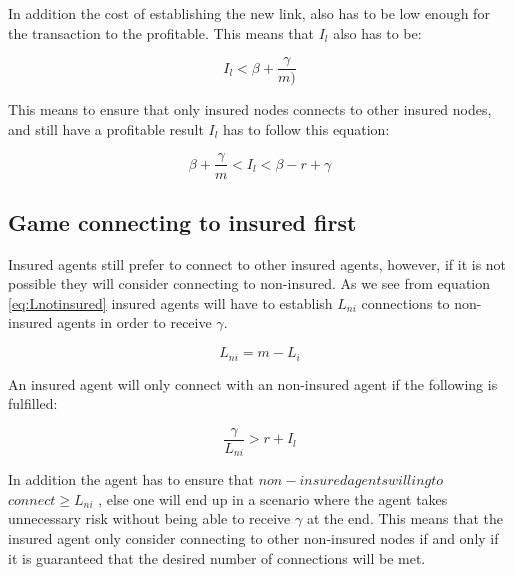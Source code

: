 In addition the cost of establishing the new link, also has to be low enough for the transaction to the profitable. This means that $I_{l}$ also has to be:

\begin{equation}
I_{l} < \beta + \frac{\gamma}{ m)} 
\label{eq:solutionToBlockNonInsured3}
\end{equation}

This means to ensure that only insured nodes connects to other insured nodes, and still have a profitable result $I_{l}$ has to follow this equation: 

\begin{equation}
  \beta + \frac{\gamma}{ m} <I_{l}< \beta - r + \gamma
\label{eq:solutionToBlockNonInsured4}
\end{equation}


\subsection{Game connecting to insured first}
Insured agents still prefer to connect to other insured agents, however, if it is not possible they will consider connecting to non-insured. As we see from equation \ref{eq:Lnotinsured} insured agents will have to establish $L_{ni}$ connections to non-insured agents in order to receive $\gamma$. 

\begin{equation} 
L_{ni} = m - L_{i} 
\label{eq:Lnotinsured}
\end{equation}



An insured agent will only connect with an non-insured agent if the following is fulfilled:

\begin{equation}
\frac{\gamma}{ L_{ni}}  > r +  I_{l}
\label{eq:gammaovernotinsured}
\end{equation}

In addition the agent has to ensure that $non-insured $\:$ agents $\:$ willing $\:$ to $\:$ connect \ge L_{ni}$ , else one will end up in a scenario where the agent takes unnecessary risk without being able to receive $\gamma$ at the end. This means that the insured agent only consider connecting to other non-insured nodes if and only if it is guaranteed that the desired number of connections will be met. 

